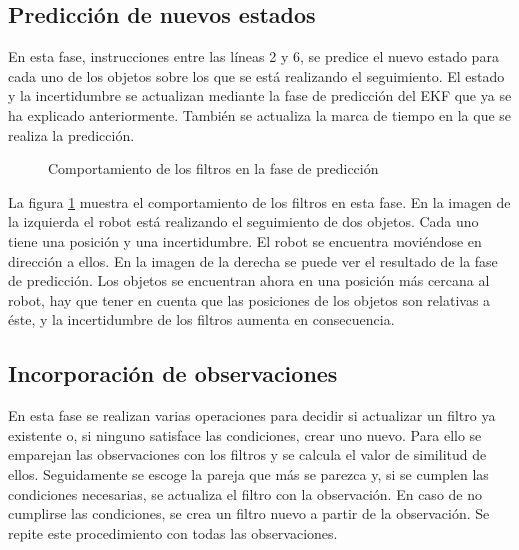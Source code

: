 \subsection{Predicción de nuevos estados}
\label{subsec:prediccionnuevosestados}

En esta fase, instrucciones entre las líneas 2 y 6, se predice el nuevo estado para cada uno de los objetos sobre los que se está realizando el seguimiento. El estado y la incertidumbre se actualizan mediante la fase de predicción del EKF que ya se ha explicado anteriormente. También se actualiza la marca de tiempo en la que se realiza la predicción.\\

\begin{figure}[h]
  \centering
  \caption{Comportamiento de los filtros en la fase de predicción}
  \label{fig:prediccion}
\end{figure}

La figura \ref{fig:prediccion} muestra el comportamiento de los filtros en esta fase. En la imagen de la izquierda el robot está realizando el seguimiento de dos objetos. Cada uno tiene una posición y una incertidumbre. El robot se encuentra moviéndose en dirección a ellos. En la imagen de la derecha se puede ver el resultado de la fase de predicción. Los objetos se encuentran ahora en una posición más cercana al robot, hay que tener en cuenta que las posiciones de los objetos son relativas a éste, y la incertidumbre de los filtros aumenta en consecuencia. \\

\subsection{Incorporación de observaciones}
\label{subsec:incorporacionobservaciones}

En esta fase se realizan varias operaciones para decidir si actualizar un filtro ya existente o, si ninguno satisface las condiciones, crear uno nuevo. Para ello se emparejan las observaciones con los filtros y se calcula el valor de similitud de ellos. Seguidamente se escoge la pareja que más se parezca y, si se cumplen las condiciones necesarias, se actualiza el filtro con la observación. En caso de no cumplirse las condiciones, se crea un filtro nuevo a partir de la observación. Se repite este procedimiento con todas las observaciones. \\

